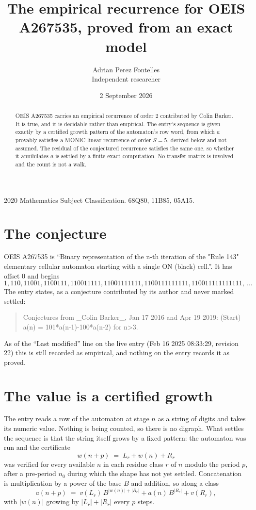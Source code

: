 \documentclass[11pt,a4paper]{article}
\title{The empirical recurrence for OEIS A267535, proved from an exact model}
\author{Adrian Perez Fontelles\\ \small Independent researcher}
\date{2 September 2026}
\theoremstyle{plain}
\theoremstyle{definition}
\begin{document}
\maketitle

\begin{abstract}
OEIS A267535 carries an empirical recurrence of order $2$ contributed by Colin Barker. It is true, and it is
decidable rather than empirical. The entry's sequence is given exactly by a certified growth pattern of the automaton's row word, from
which $a$ provably satisfies a MONIC linear recurrence of order $S=5$, derived below and not
assumed. The residual of the conjectured recurrence satisfies the same one, so whether it
annihilates $a$ is settled by a finite exact computation. No transfer matrix is involved and
the count is not a walk.
\end{abstract}

\noindent\small 2020 Mathematics Subject Classification. 68Q80, 11B85, 05A15.\normalsize

\section{The conjecture}

OEIS A267535 is ``Binary representation of the n-th iteration of the "Rule 143" elementary cellular automaton starting with a single ON (black) cell.''. It has offset $0$ and begins
\[
1, 110, 11001, 1100111, 110011111, 11001111111, 1100111111111, 110011111111111,\ \dots
\]
The entry states, as a conjecture contributed by its author and never marked settled:
\begin{quote}
Conjectures from \_Colin Barker\_, Jan 17 2016 and Apr 19 2019: (Start) a(n) = 101*a(n-1)-100*a(n-2) for n>3.
\end{quote}
As of the ``Last modified'' line on the live entry (Feb 16 2025 08:33:29, revision 22)
this is still recorded as empirical, and nothing on the entry records it as proved.

\section{The value is a certified growth}

The entry reads a row of the automaton at stage $n$ as a string of digits and takes its
numeric value. Nothing is being counted, so there is no digraph. What settles the sequence is
that the string itself grows by a fixed pattern: the automaton was run and the certificate
\[
w(n+p)\;=\;L_r + w(n) + R_r
\]
was verified for every available $n$ in each residue class $r$ of $n$ modulo the period $p$,
after a pre-period $n_0$ during which the shape has not yet settled. Concatenation is
multiplication by a power of the base $B$ and addition, so along a class
\[
a(n+p)\;=\;v(L_r)\,B^{|w(n)|+|R_r|} + a(n)\,B^{|R_r|} + v(R_r),
\]
with $|w(n)|$ growing by $|L_r|+|R_r|$ every $p$ steps.
\end{document}
